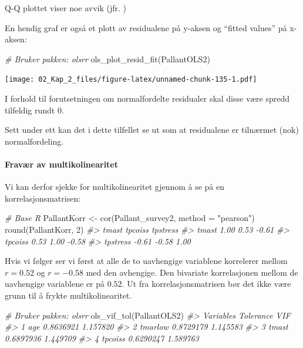 \documentclass[
]{article}
\newenvironment{Shaded}{\begin{snugshade}}{\end{snugshade}}
\newcommand{\AttributeTok}[1]{\textcolor[rgb]{0.77,0.63,0.00}{#1}}
\newcommand{\CommentTok}[1]{\textcolor[rgb]{0.56,0.35,0.01}{\textit{#1}}}
\newcommand{\DecValTok}[1]{\textcolor[rgb]{0.00,0.00,0.81}{#1}}
\newcommand{\FunctionTok}[1]{\textcolor[rgb]{0.00,0.00,0.00}{#1}}
\newcommand{\NormalTok}[1]{#1}
\newcommand{\OtherTok}[1]{\textcolor[rgb]{0.56,0.35,0.01}{#1}}
\newcommand{\StringTok}[1]{\textcolor[rgb]{0.31,0.60,0.02}{#1}}
\begin{document}
Q-Q plottet viser noe avvik (jfr. )

En hendig graf er også et plott av residualene på y-aksen og ``fitted values'' på x-aksen:

\begin{Shaded}
\begin{Highlighting}[]
\CommentTok{\# Bruker pakken: olsrr}
\FunctionTok{ols\_plot\_resid\_fit}\NormalTok{(PallantOLS2)}
\end{Highlighting}
\end{Shaded}

\texttt{[image: 02\_Kap\_2\_files/figure-latex/unnamed-chunk-135-1.pdf]}

I forhold til forutsetningen om normalfordelte residualer skal disse være spredd tilfeldig rundt 0.

Sett under ett kan det i dette tilfellet se ut som at residualene er tilnærmet (nok) normalfordeling.

\hypertarget{fravuxe6r-av-multikolinearitet-2}{%
\paragraph{Fravær av multikolinearitet}\label{fravuxe6r-av-multikolinearitet-2}}

Vi kan derfor sjekke for multikolinearitet gjennom å se på en korrelasjonsmatrisen:

\begin{Shaded}
\begin{Highlighting}[]
\CommentTok{\# Base R}
\NormalTok{PallantKorr }\OtherTok{\textless{}{-}} \FunctionTok{cor}\NormalTok{(Pallant\_survey2, }\AttributeTok{method =} \StringTok{"pearson"}\NormalTok{)}
\FunctionTok{round}\NormalTok{(PallantKorr, }\DecValTok{2}\NormalTok{)}
\CommentTok{\#\textgreater{}          tmast tpcoiss tpstress}
\CommentTok{\#\textgreater{} tmast     1.00    0.53    {-}0.61}
\CommentTok{\#\textgreater{} tpcoiss   0.53    1.00    {-}0.58}
\CommentTok{\#\textgreater{} tpstress {-}0.61   {-}0.58     1.00}
\end{Highlighting}
\end{Shaded}

Hvis vi følger \citet{pallantSPSSSurvivalManual2010} ser vi først at alle de to uavhengige variablene korrelerer mellom \(r=0.52\) og \(r=-0.58\) med den avhengige. Den bivariate korrelasjonen mellom de uavhengige variablene er på \(0.52\). Ut fra korrelasjonsmatrisen bør det ikke være grunn til å frykte multikolinearitet.

\begin{Shaded}
\begin{Highlighting}[]
\CommentTok{\# Bruker pakken: olsrr}
\FunctionTok{ols\_vif\_tol}\NormalTok{(PallantOLS2)}
\CommentTok{\#\textgreater{}   Variables Tolerance      VIF}
\CommentTok{\#\textgreater{} 1       age 0.8636921 1.157820}
\CommentTok{\#\textgreater{} 2   tmarlow 0.8729179 1.145583}
\CommentTok{\#\textgreater{} 3     tmast 0.6897936 1.449709}
\CommentTok{\#\textgreater{} 4   tpcoiss 0.6290247 1.589763}
\end{Highlighting}
\end{Shaded}
\end{document}
